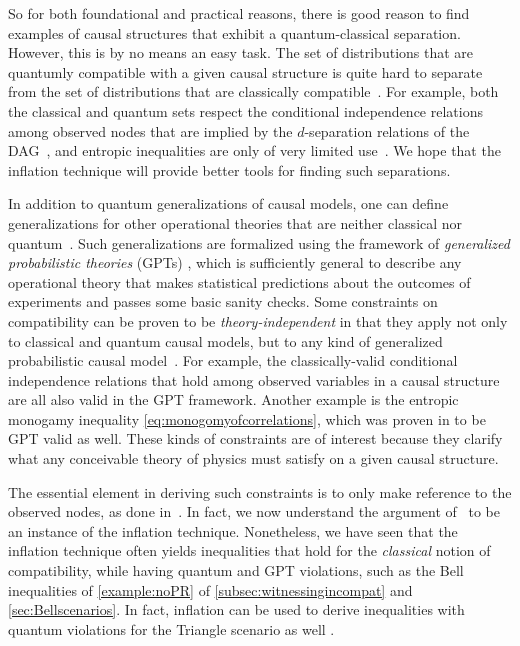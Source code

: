 \documentclass[aps,english,10pt,superscriptaddress,onecolumn,twoside,longbibliography,pra,floatfix,fleqn,nofootinbib]{revtex4-1}
\theoremstyle{definition}
\newcounter{example}[section]
\begin{document}
So for both foundational and practical reasons, there is good reason to find examples of causal structures that exhibit a quantum-classical separation.
However, this is by no means an easy task.
The set of distributions that are quantumly compatible with a given causal structure is quite hard to separate from the set of distributions that are classically compatible~\cite{pusey2014gdag,fritz2012bell}. For example, both the classical and quantum sets respect the conditional independence relations among observed nodes that are implied by the $d$-separation relations of the DAG~\cite{pusey2014gdag}, and entropic inequalities are only of very limited use~\cite{chaves2012entropic,fritz2012bell}. We hope that the inflation technique will provide better tools for finding such separations.

In addition to quantum generalizations of causal models, one can define generalizations for other operational theories that are neither classical nor quantum~\cite{pusey2014gdag,BeyondBellII}.
Such generalizations are formalized using the framework of {\em generalized probabilistic theories} (GPTs) \cite{Barnum2012GPT,Janotta2014GPT}, which is sufficiently general to describe any operational theory that makes statistical predictions about the outcomes of experiments and passes some basic sanity checks.  Some constraints on compatibility can be proven to be \emph{theory-independent} in that they apply not only to classical and quantum causal models, but to any kind of generalized probabilistic causal model~\cite{pusey2014gdag}. For example, the classically-valid conditional independence relations that hold among observed variables in a causal structure are all also valid in the GPT framework.
Another example is the entropic monogamy inequality \cref{eq:monogomyofcorrelations}, which was proven in \cite{pusey2014gdag} to be GPT valid as well. These kinds of constraints are of interest because they clarify what any conceivable theory of physics must satisfy on a given causal structure. 

The essential element in deriving such constraints is to only make reference to the observed nodes, as done in~\cite{pusey2014gdag}. In fact, we now understand the argument of~\cite{pusey2014gdag} to be an instance of the inflation technique. Nonetheless, we have seen that the inflation technique often yields inequalities that hold for the {\em classical} notion of compatibility, while having quantum and GPT violations, such as the Bell inequalities of \cref{example:noPR} of \cref{subsec:witnessingincompat} and \cref{sec:Bellscenarios}. In fact, inflation can be used to derive inequalities with quantum violations for the Triangle scenario as well \cite{TC2016trianglequantum}.
\end{document}
